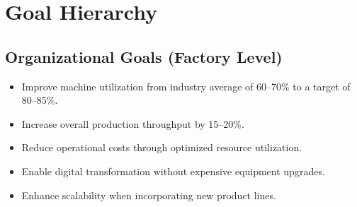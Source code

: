 




\section{Goal Hierarchy}
\label{section:technology-stack}
\subsection{Organizational Goals (Factory Level)}
\begin{itemize}
    \item Improve machine utilization from industry average of 60--70\% to a target of 80--85\%.
    \item Increase overall production throughput by 15--20\%.
    \item Reduce operational costs through optimized resource utilization.
    \item Enable digital transformation without expensive equipment upgrades.
    \item Enhance scalability when incorporating new product lines.
\end{itemize}

